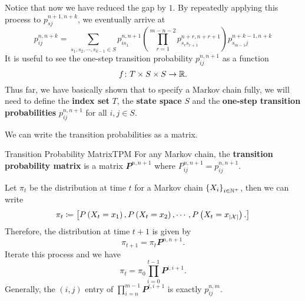 \documentclass[math, code]{amznotes}
\theoremstyle{remark}
\begin{document}
Notice that now we have reduced the gap by $1$. By repeatedly applying this process to $p_{sj}^{n + 1, n + k}$, we eventually arrive at 
\begin{equation*}
    p_{ij}^{n, n + k} = \sum_{s_1, s_2, \cdots, s_{k - 1} \in S}p_{is_1}^{n, n + 1}\left(\prod_{r = 1}^{m - n - 2}p_{s_rs_{r + 1}}^{n + r, n + r + 1}\right)p_{s_{m - 1}j}^{n + k - 1, n + k}
\end{equation*}
It is useful to see the one-step transition probability $p_{ij}^{n, n + 1}$ as a function 
\begin{equation*}
    f \colon T \times S \times S \to \mathbb{R}.
\end{equation*}
Thus far, we have basically shown that to specify a Markov chain fully, we will need to define the \textbf{index set} $T$, the \textbf{state space} $S$ and the \textbf{one-step transition probabilities} $p_{ij}^{n, n + 1}$ for all $i, j \in S$. 

We can write the transition probabilities as a matrix.
\begin{dfnbox}{Transition Probability Matrix}{TPM}
    For any Markov chain, the {\color{red} \textbf{transition probability matrix}} is a matrix $\mathbfit{P}^{n, n + 1}$ where $P^{n, n + 1}_{ij} = p_{ij}^{n, n + 1}$.
\end{dfnbox}
Let $\pi_t$ be the distribution at time $t$ for a Markov chain $\left\{X_i\right\}_{i \in \mathbb{N}^+}$, then we can write 
\begin{equation*}
    \pi_t \coloneqq \begin{bmatrix}
        P\left(X_t = x_1\right), P\left(X_t = x_2\right), \cdots, P\left(X_t = x_{{\left\lvert {\mathcal{X}} \right\rvert}}\right).
    \end{bmatrix}
\end{equation*}
Therefore, the distribution at time $t + 1$ is given by 
\begin{equation*}
    \pi_{t + 1} = \pi_t\mathbfit{P}^{n, n + 1}.
\end{equation*}
Iterate this process and we have 
\begin{equation*}
    \pi_t = \pi_0\prod_{i = 0}^{t - 1}\mathbfit{P}^{i, i + 1}.
\end{equation*}
Generally, the $\left(i, j\right)$ entry of $\prod_{i = n}^{m - 1}\mathbfit{P}^{i, i + 1}$ is exactly $p_{ij}^{n, m}$.
\end{document}
